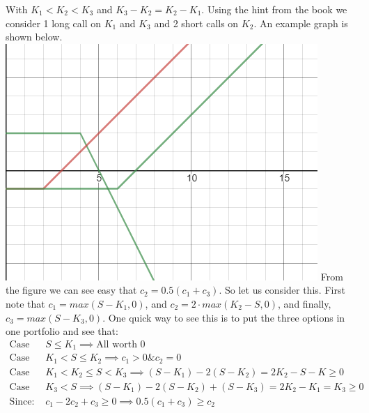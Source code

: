 \documentclass[12pt]{article}
\newenvironment{problem}[3][Problem]{\begin{trivlist}
\item[\hskip \labelsep {\bfseries #1}\hskip \labelsep {\bfseries #2.}]}{\end{trivlist}}
\begin{document}
\begin{problem}{11.25}. With $K_1 < K_2 < K_3$ and $K_3 - K_2 = K_2 - K_1$. Using the hint from the book we consider 1 long call on $K_1$ and $K_3$ and 2 short calls on $K_2$. An example graph is shown below. 
\includegraphics[width=.5\textwidth]{mod8p24.png}
From the figure we can see easy that $c_2 = 0.5(c_1 + c_3)$. So let us consider this. First note that $c_1 = max(S-K_1,0)$, and $c_2 = 2\cdot max(K_2-S,0)$, and finally, $c_3 = max(S-K_3,0)$. One quick way to see this is to put the three options in one portfolio and see that:
\begin{align*}
\text{Case 1:}& S \leq K_1 \implies \text{All worth 0} \\
\text{Case 2:}& K_1 < S \leq K_2 \implies c_1>0 \& c_2 = 0 \\
\text{Case 3:}& K_1 < K_2 \leq S < K_3 \implies (S-K_1) - 2(S-K_2) = 2K_2 -S - K \geq 0 \\
\text{Case 4:}& K_3 < S  \implies (S-K_1) -2(S-K_2) + (S-K_3) = 2K_2 - K_1 = K_3 \geq 0 \\
\text{Since:  }& c_1 -2c_2 + c_3 \geq 0 \implies 0.5(c_1 + c_3) \geq c_2
\end{align*}
\end{problem}
\end{document}
